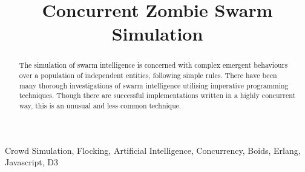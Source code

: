 \documentclass[10pt, a4paper, conference, compsocconf]{IEEEtran}
\begin{document}
\title{Concurrent Zombie Swarm Simulation}
\author{
\and
{}
\and
{}
}

\maketitle

\begin{abstract}
The simulation of swarm intelligence is concerned with complex emergent behaviours over a population of independent entities, following simple rules. There have been many thorough investigations of swarm intelligence utilising imperative programming techniques. Though there are successful implementations written in a highly concurrent way, this is an unusual and less common technique.
\end{abstract}
\begin{IEEEkeywords}
Crowd Simulation, Flocking, Artificial Intelligence, Concurrency, Boids, Erlang, Javascript, D3
\end{IEEEkeywords}
\end{document}
